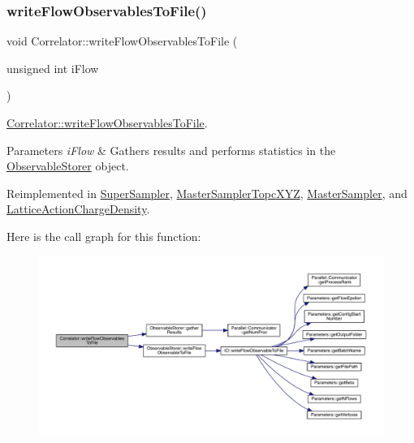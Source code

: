\subsubsection{\texorpdfstring{writeFlowObservablesToFile()}{writeFlowObservablesToFile()}}
{\footnotesize\ttfamily void Correlator\+::write\+Flow\+Observables\+To\+File (\begin{DoxyParamCaption}\item[{unsigned int}]{i\+Flow }\end{DoxyParamCaption})\hspace{0.3cm}{\ttfamily [virtual]}}



\mbox{\hyperlink{class_correlator_a168512b2ce182d9478db47f100125fa6}{Correlator\+::write\+Flow\+Observables\+To\+File}}. 


\begin{DoxyParams}{Parameters}
{\em i\+Flow} & Gathers results and performs statistics in the \mbox{\hyperlink{class_observable_storer}{Observable\+Storer}} object. \\
\hline
\end{DoxyParams}


Reimplemented in \mbox{\hyperlink{class_super_sampler_a410b650ebccdb03519c88908a3a8013e}{Super\+Sampler}}, \mbox{\hyperlink{class_master_sampler_topc_x_y_z_a4fba4290e4406e18ef3f2904c6ae364f}{Master\+Sampler\+Topc\+X\+YZ}}, \mbox{\hyperlink{class_master_sampler_ad475928217ac61fae134128904aaa9f8}{Master\+Sampler}}, and \mbox{\hyperlink{class_lattice_action_charge_density_a54226556dc1497c311e4a4d50bf44c26}{Lattice\+Action\+Charge\+Density}}.

Here is the call graph for this function\+:
\nopagebreak
\begin{figure}[H]
\begin{center}
\leavevmode
\includegraphics[width=350pt]{class_correlator_a168512b2ce182d9478db47f100125fa6_cgraph}
\end{center}
\end{figure}
\mbox{\label{class_correlator_a9e8d80e30e4fbe3b7fe57521538cb5ff}} 
